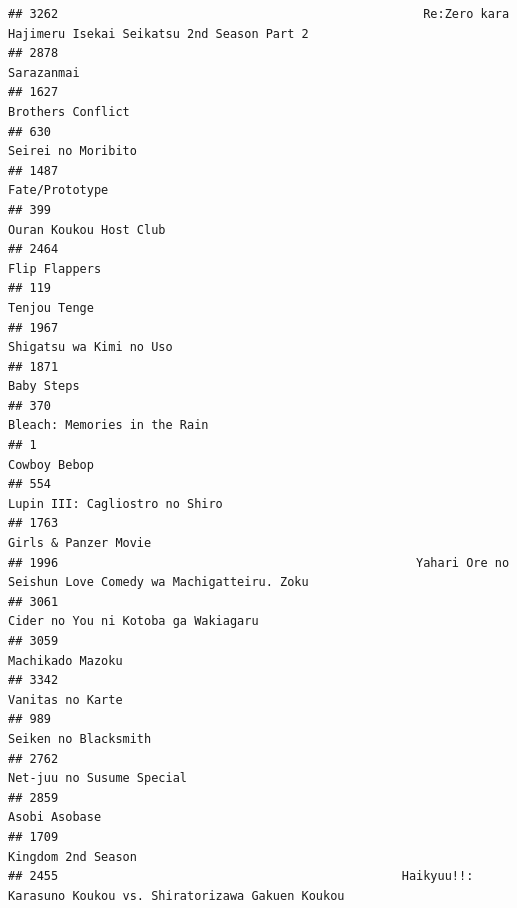 \documentclass[
]{article}
\begin{document}
\begin{verbatim}
## 3262                                                   Re:Zero kara Hajimeru Isekai Seikatsu 2nd Season Part 2
## 2878                                                                                                Sarazanmai
## 1627                                                                                         Brothers Conflict
## 630                                                                                         Seirei no Moribito
## 1487                                                                                            Fate/Prototype
## 399                                                                                     Ouran Koukou Host Club
## 2464                                                                                             Flip Flappers
## 119                                                                                               Tenjou Tenge
## 1967                                                                                   Shigatsu wa Kimi no Uso
## 1871                                                                                                Baby Steps
## 370                                                                               Bleach: Memories in the Rain
## 1                                                                                                 Cowboy Bebop
## 554                                                                             Lupin III: Cagliostro no Shiro
## 1763                                                                                      Girls & Panzer Movie
## 1996                                                  Yahari Ore no Seishun Love Comedy wa Machigatteiru. Zoku
## 3061                                                                       Cider no You ni Kotoba ga Wakiagaru
## 3059                                                                                          Machikado Mazoku
## 3342                                                                                          Vanitas no Karte
## 989                                                                                       Seiken no Blacksmith
## 2762                                                                                 Net-juu no Susume Special
## 2859                                                                                             Asobi Asobase
## 1709                                                                                        Kingdom 2nd Season
## 2455                                                Haikyuu!!: Karasuno Koukou vs. Shiratorizawa Gakuen Koukou

\end{verbatim}
\end{document}
